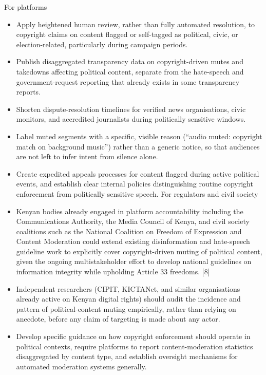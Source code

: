 \documentclass{article}
\begin{document}
For platforms
\begin{itemize}

\item Apply heightened human review, rather than fully automated resolution, to copyright claims on content flagged or self-tagged as political, civic, or election-related, particularly during campaign periods.
\item Publish disaggregated transparency data on copyright-driven mutes and takedowns affecting political content, separate from the hate-speech and government-request reporting that already exists in some transparency reports.
\item Shorten dispute-resolution timelines for verified news organisations, civic monitors, and accredited journalists during politically sensitive windows.
\item Label muted segments with a specific, visible reason (“audio muted: copyright match on background music”) rather than a generic notice, so that audiences are not left to infer intent from silence alone.
\item Create expedited appeals processes for content flagged during active political events, and establish clear internal policies distinguishing routine copyright enforcement from politically sensitive speech.
For regulators and civil society
\item Kenyan bodies already engaged in platform accountability including the Communications Authority, the Media Council of Kenya, and civil society coalitions such as the National Coalition on Freedom of Expression and Content Moderation could extend existing disinformation and hate-speech guideline work to explicitly cover copyright-driven muting of political content, given the ongoing multistakeholder effort to develop national guidelines on information integrity while upholding Article 33 freedoms. [8]
\item Independent researchers (CIPIT, KICTANet, and similar organisations already active on Kenyan digital rights) should audit the incidence and pattern of political-content muting empirically, rather than relying on anecdote, before any claim of targeting is made about any actor.
\item Develop specific guidance on how copyright enforcement should operate in political contexts, require platforms to report content-moderation statistics disaggregated by content type, and establish oversight mechanisms for automated moderation systems generally.
\end{itemize}
\end{document}

